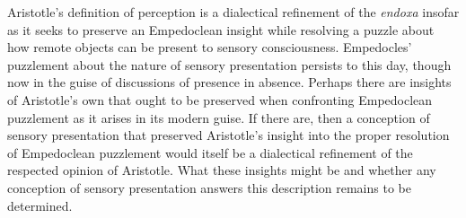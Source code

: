 Aristotle's definition of perception is a dialectical refinement of the \emph{endoxa} insofar as it seeks to preserve an Empedoclean insight while resolving a puzzle about how remote objects can be present to sensory consciousness. Empedocles' puzzlement about the nature of sensory presentation persists to this day, though now in the guise of discussions of presence in absence. Perhaps there are insights of Aristotle's own that ought to be preserved when confronting Empedoclean puzzlement as it arises in its modern guise. If there are, then a conception of sensory presentation that preserved Aristotle's insight into the proper resolution of Empedoclean puzzlement would itself be a dialectical refinement of the respected opinion of Aristotle. What these insights might be and whether any conception of sensory presentation answers this description remains to be determined.



